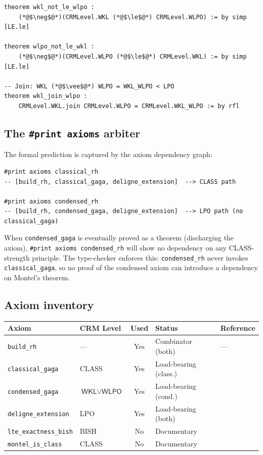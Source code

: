 \documentclass[11pt,a4paper]{article}
\theoremstyle{plain}
\theoremstyle{definition}
\newcommand{\BISH}{\textsf{BISH}}
\newcommand{\WKL}{\textsf{WKL}}
\newcommand{\WLPO}{\textsf{WLPO}}
\newcommand{\LPO}{\textsf{LPO}}
\newcommand{\CLASS}{\textsf{CLASS}}
\begin{document}
\begin{tcolorbox}[leanbox={Incomparability proof (CRMLevel.lean)}]
\begin{lstlisting}[style=leanstyle]
theorem wkl_not_le_wlpo :
    (*@$\neg$@*)(CRMLevel.WKL (*@$\le$@*) CRMLevel.WLPO) := by simp [LE.le]

theorem wlpo_not_le_wkl :
    (*@$\neg$@*)(CRMLevel.WLPO (*@$\le$@*) CRMLevel.WKL) := by simp [LE.le]

-- Join: WKL (*@$\vee$@*) WLPO = WKL_WLPO < LPO
theorem wkl_join_wlpo :
    CRMLevel.WKL.join CRMLevel.WLPO = CRMLevel.WKL_WLPO := by rfl
\end{lstlisting}
\end{tcolorbox}

\subsection{The \texttt{\#print axioms} arbiter}

The formal prediction is captured by the axiom dependency graph:

\begin{verbatim}
#print axioms classical_rh
-- [build_rh, classical_gaga, deligne_extension]  --> CLASS path

#print axioms condensed_rh
-- [build_rh, condensed_gaga, deligne_extension]  --> LPO path (no classical_gaga)
\end{verbatim}

When \texttt{condensed\_gaga} is eventually proved as a theorem (discharging the axiom), \texttt{\#print axioms condensed\_rh} will show no dependency on any \CLASS-strength principle.
The type-checker enforces this: \texttt{condensed\_rh} never invokes \texttt{classical\_gaga}, so no proof of the condensed axiom can introduce a dependency on Montel's theorem.

\subsection{Axiom inventory}

\begin{center}
\small
\begin{tabular}{@{}llcll@{}}
\toprule
Axiom & CRM Level & Used & Status & Reference \\
\midrule
\texttt{build\_rh} & --- & Yes & Combinator (both) & --- \\
\texttt{classical\_gaga} & \CLASS & Yes & Load-bearing (class.) & \cite{Serre1956} \\
\texttt{condensed\_gaga} & $\WKL \!\vee\! \WLPO$ & Yes & Load-bearing (cond.) & \cite{ClausenScholze2022} \\
\texttt{deligne\_extension} & \LPO & Yes & Load-bearing (both) & \cite{Deligne1970} \\
\texttt{lte\_exactness\_bish} & \BISH & No & Documentary & \cite{Commelin2022} \\
\texttt{montel\_is\_class} & \CLASS & No & Documentary & \cite{Simpson2009} \\
\bottomrule
\end{tabular}
\end{center}
\end{document}
